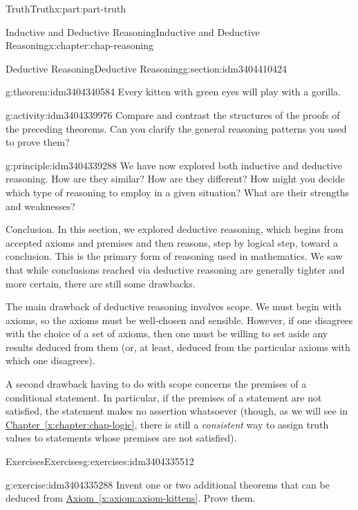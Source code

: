 \documentclass[oneside,10pt,]{book}
\newcommand{\xreffont}{\relax}
\numberwithin{equation}{section}
\begin{document}
\begin{partptx}{Truth}{}{Truth}{}{}{x:part:part-truth}
\begin{chapterptx}{Inductive and Deductive Reasoning}{}{Inductive and Deductive Reasoning}{}{}{x:chapter:chap-reasoning}
\begin{sectionptx}{Deductive Reasoning}{}{Deductive Reasoning}{}{}{g:section:idm3404410424}
\begin{theorem}{}{}{g:theorem:idm3404340584}%
Every kitten with green eyes will play with a gorilla.%
\end{theorem}
\begin{activity}{}{g:activity:idm3404339976}%
Compare and contrast the structures of the proofs of the preceding theorems. Can you clarify the general reasoning patterns you used to prove them?%
\end{activity}%
\begin{principle}{}{}{g:principle:idm3404339288}%
We have now explored both inductive and deductive reasoning. How are they similar? How are they different? How might you decide which type of reasoning to employ in a given situation? What are their strengths and weaknesses?%
\end{principle}
\begin{conclusion}{Conclusion.}%
In this section, we explored deductive reasoning, which begins from accepted axioms and premises and then reasons, step by logical step, toward a conclusion. This is the primary form of reasoning used in mathematics. We saw that while conclusions reached via deductive reasoning are generally tighter and more certain, there are still some drawbacks.%
\par
The main drawback of deductive reasoning involves scope. We must begin with axioms, so the axioms must be well-chosen and sensible. However, if one disagrees with the choice of a set of axioms, then one must be willing to set aside any results deduced from them (or, at least, deduced from the particular axioms with which one disagrees).%
\par
A second drawback having to do with scope concerns the premises of a conditional statement. In particular, if the premises of a statement are not satisfied, the statement makes no assertion whatsoever (though, as we will see in \hyperref[x:chapter:chap-logic]{Chapter~{\xreffont\ref{x:chapter:chap-logic}}}, there is still a \emph{consistent} way to assign truth values to statements whose premises are not satisfied).%
\end{conclusion}%
%
%
\typeout{************************************************}
\typeout{************************************************}
%
\begin{exercises-subsection-numberless}{Exercises}{}{Exercises}{}{}{g:exercises:idm3404335512}
\begin{divisionexercise}{1}{}{}{g:exercise:idm3404335288}%
Invent one or two additional theorems that can be deduced from \hyperref[x:axiom:axiom-kittens]{Axiom~{\xreffont\ref{x:axiom:axiom-kittens}}}. Prove them.%

\end{divisionexercise}
\end{exercises-subsection-numberless}
\end{sectionptx}
\end{chapterptx}
\end{partptx}
\end{document}
